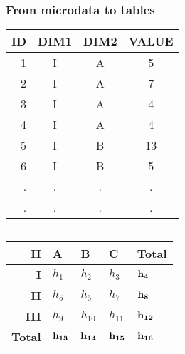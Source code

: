 \begin{frame}\frametitle{From microdata to tables}
	\vspace{-0.2cm}
	\begin{center}
	\begin{tabular}{|r|ccc|}
	\hline
	{\bf ID} & {\bf DIM1} & {\bf DIM2} & {\bf VALUE}  \\ \hline
	1 & I & A & 5 \\ 
	2 & I & A & 7 \\ 
	3 & I & A & 4 \\	
	4 & I & A & 4 \\
	5 & I & B & 13 \\ 
	6 & I & B & 5 \\ 	
	. & . & . & . \\ 	
	. & . & . & . \\ 			
	\hline
	\end{tabular}
	\end{center}
	
	\vspace{-1cm}
	
	\begin{columns}
	\begin{column}{5cm}
		\begin{center}
			\begin{tabular}{|r|lll|l|}
			\hline
			{\bf H} & {\bf A} & {\bf B} & {\bf C} & {\bf Total} \\ 
			\hline
			{\bf I} & $h_1$ & $h_2$ & $h_3$ & $\mathbf{h_4}$ \\ 
			{\bf II} & $h_5$ & $h_6$ & $h_7$ & $\mathbf{h_8}$ \\ 
			{\bf III} & $h_9$ & $h_{10}$ & $h_{11}$ & $\mathbf{h_{12}}$ \\ 
			\hline
			{\bf Total} & $\mathbf{h_{13}}$ & $\mathbf{h_{14}}$ & $\mathbf{h_{15}}$ & $\mathbf{h_{16}}$ \\
			\hline
			\end{tabular}
		\end{center}	
	\end{column}
	\begin{column}{5cm}
	\end{column}
	\end{columns}
\end{frame}

